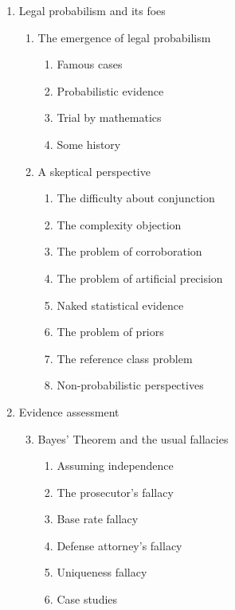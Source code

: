 \documentclass[11pt,dvipsnames,enabledeprecatedfontcommands]{scrartcl}
\begin{document}
\renewcommand{\labelenumi}{\Roman{enumi}}
\renewcommand{\labelenumii}{\arabic{enumii}}
\renewcommand{\labelenumiii}{\arabic{enumii}.\arabic{enumiii}}

\begin{multicols}{2}
\footnotesize
\begin{enumerate}
\item Legal probabilism and its foes
\begin{enumerate}

  \item The emergence of legal probabilism
  \begin{enumerate}
  \item  Famous cases
  \item  Probabilistic evidence
  \item  Trial by mathematics
  \item  Some history
  \end{enumerate}

  \item  A skeptical perspective
  \begin{enumerate}
  \item The difficulty about conjunction
  \item The complexity objection
  \item  The problem of corroboration
  \item  The problem of artificial precision
  \item Naked statistical evidence
  \item  The problem of priors
  \item  The reference class problem
  \item  Non-probabilistic perspectives
  \end{enumerate}


\end{enumerate}
\item  Evidence assessment
\begin{enumerate}


\setcounter{enumii}{2}
  \item  Bayes' Theorem and the usual fallacies
  \begin{enumerate}
  \item  Assuming independence
  \item  The prosecutor's fallacy
  \item  Base rate fallacy
  \item  Defense attorney's fallacy
  \item  Uniqueness fallacy
  \item  Case studies
  \end{enumerate}


\end{enumerate}
\end{enumerate}
\end{multicols}
\end{document}
